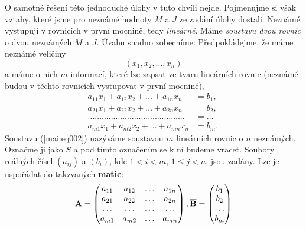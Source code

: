     O samotné řešení této jednoduché úlohy v tuto chvíli nejde. Pojmenujme si však vztahy, které 
    jsme pro neznámé hodnoty \(M\) a \(J\) ze zadání úlohy dostali. Neznámé vystupují v 
    rovnicích v první mocnině, tedy \emph{lineárně}. Máme \emph{soustavu dvou rovnic} o dvou 
    neznámých \(M\) a \(J\). Úvahu snadno zobecníme: Předpokládejme, že máme neznámé veličiny
    \begin{equation*}
      (x_1, x_2, \ldots, x_n)
    \end{equation*}
    a máme o nich \(m\) informací, které lze zapsat ve tvaru lineárních rovnic (neznámé budou v 
    těchto rovnicích vystupovat v první mocnině),
    \begin{align}
      a_{11}x_1 + a_{12}x_2 + \ldots + a_{1n}x_n &= b_1,     \nonumber           \\
      a_{21}x_1 + a_{22}x_2 + \ldots + a_{2n}x_n &= b_2,     \label{mai:eq002}   \\
      .......................................... &= \ldots   \nonumber           \\
      a_{m1}x_1 + a_{m2}x_2 + \ldots + a_{mn}x_n &= b_m,     \nonumber
    \end{align}
    Soustavu (\ref{mai:eq002}) nazýváme soustavou \(m\) lineárních rovnic o \(n\) neznámých. 
    Označme ji jako \(S\) a pod tímto označením se k ní budeme vracet. Soubory reálných čísel 
    \((a_{ij})\) a \((b_i)\), kde \(1 < i < m\), \(1 \leq j < n\), jsou zadány. Lze je uspořádat 
    do takzvaných \textbf{matic}:
    \begin{equation}\label{mai:eq003}
      \mathbf{A} =
        \begin{pmatrix}
          a_{11} & a_{12} & \ldots & a_{1n} \\
          a_{21} & a_{22} & \ldots & a_{2n} \\
          \ldots & \ldots & \ldots & \ldots \\
          a_{m1} & a_{m2} & \ldots & a_{mn}          
        \end{pmatrix},
        \overline{\mathbf{B}} =
        \begin{pmatrix}
          b_1     \\
          b_2     \\
          \ldots  \\
          b_m 
        \end{pmatrix}
    \end{equation}
    
